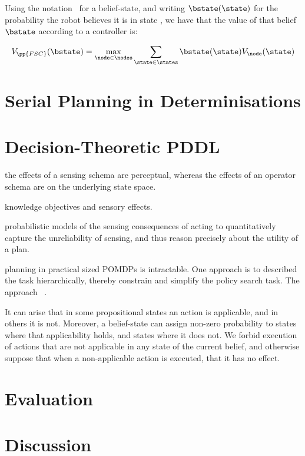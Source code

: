 \documentclass[letterpaper]{article}
\begin{document}
Using the notation \bstate\ for a belief-state, and writing
$\bstate(\state)$ for the probability the robot believes it is in
state \state, we have that the value of that belief $\bstate$ according to a
controller is:

\begin{equation} \label{eq:valueBelief}
V_{\pp{FSC}}(\bstate) = \max_{\node \in \nodes} \sum_{\state \in \states} \bstate(\state) V_\node(\state)
\end{equation}





\section{Serial Planning in Determinisations}



\section{Decision-Theoretic PDDL}

the effects of a sensing schema are perceptual, whereas the effects of
an operator schema are on the underlying state space. 


knowledge objectives and  sensory effects. 


probabilistic models of the sensing consequences of acting to
quantitatively capture the unreliability of sensing, and thus reason
precisely about the utility of a plan. 


planning in practical sized POMDPs is intractable. One approach is to
described the task hierarchically, thereby constrain and simplify the
policy search task. The approach ~\cite{}. 



It can arise that in some propositional states an action is
applicable, and in others it is not. Moreover, a belief-state can
assign non-zero probability to states where that applicability holds,
and states where it does not. We forbid execution of actions that are
not applicable in any state of the current belief, and otherwise
suppose that when a non-applicable action is executed, that it has
no effect.


\section{Evaluation}


\section{Discussion}
\end{document}

